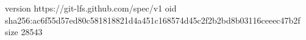 version https://git-lfs.github.com/spec/v1
oid sha256:ac6f55d57ed80c581818821d4a451c168574d45c2f2b2bd8b03116ceeec47b2f
size 28543
